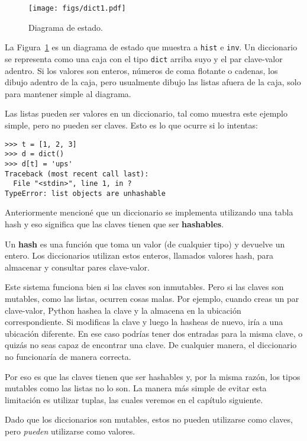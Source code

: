 \documentclass[10pt]{book}
\begin{document}
\begin{figure}
\centerline
{\texttt{[image: figs/dict1.pdf]}}
\caption{Diagrama de estado.}
\label{fig.dict1}
\end{figure}

La Figura~\ref{fig.dict1} es un diagrama de estado que muestra a {\tt hist} e {\tt inv}.
Un diccionario se representa como una caja con el tipo {\tt dict} arriba suyo
y el par clave-valor adentro.  Si los valores son enteros, números de coma flotante o
cadenas, los dibujo adentro de la caja, pero usualmente dibujo las listas
afuera de la caja, solo para mantener simple al diagrama.

Las listas pueden ser valores en un diccionario, tal como muestra este ejemplo simple, pero
no pueden ser claves.  Esto es lo que ocurre si lo intentas:


\begin{verbatim}
>>> t = [1, 2, 3]
>>> d = dict()
>>> d[t] = 'ups'
Traceback (most recent call last):
  File "<stdin>", line 1, in ?
TypeError: list objects are unhashable
\end{verbatim}
%
Anteriormente mencioné que un diccionario se implementa utilizando
una tabla hash y eso significa que las claves tienen que ser {\bf hashables}.

Un {\bf hash} es una función que toma un valor (de cualquier tipo)
y devuelve un entero.  Los diccionarios utilizan estos enteros,
llamados valores hash, para almacenar y consultar pares clave-valor.

Este sistema funciona bien si las claves son inmutables.  Pero si las
claves son mutables, como las listas, ocurren cosas malas.  Por ejemplo,
cuando creas un par clave-valor, Python hashea la clave y
la almacena en la ubicación correspondiente.  Si modificas la
clave y luego la hasheas de nuevo, iría a una ubicación diferente.
En ese caso podrías tener dos entradas para la misma clave,
o quizás no seas capaz de encontrar una clave.  De cualquier manera, el
diccionario no funcionaría de manera correcta.

Por eso es que las claves tienen que ser hashables y, por la misma razón, los tipos mutables como
las listas no lo son.  La manera más simple de evitar esta limitación es
utilizar tuplas, las cuales veremos en el capítulo siguiente.

Dado que los diccionarios son mutables, estos no pueden utilizarse como claves,
pero {\em pueden} utilizarse como valores.
\end{document}
